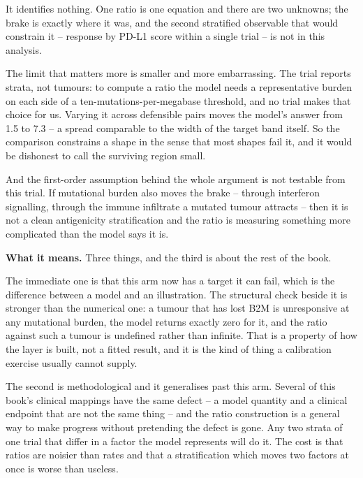 \documentclass[11pt,twoside,openright]{report}
\begin{document}
\begin{refusal}
It identifies nothing. One ratio is one equation and there are two unknowns; the brake is exactly where it was, and the second stratified observable that would constrain it -- response by PD-L1 score within a single trial -- is not in this analysis.

The limit that matters more is smaller and more embarrassing. The trial reports strata, not tumours: to compute a ratio the model needs a representative burden on each side of a ten-mutations-per-megabase threshold, and no trial makes that choice for us. Varying it across defensible pairs moves the model's answer from 1.5 to 7.3 -- a spread comparable to the width of the target band itself. So the comparison constrains a shape in the sense that most shapes fail it, and it would be dishonest to call the surviving region small.

And the first-order assumption behind the whole argument is not testable from this trial. If mutational burden also moves the brake -- through interferon signalling, through the immune infiltrate a mutated tumour attracts -- then it is not a clean antigenicity stratification and the ratio is measuring something more complicated than the model says it is.
\end{refusal}

\textbf{What it means.} Three things, and the third is about the rest of the book.

The immediate one is that this arm now has a target it can fail, which is the difference between a model and an illustration. The structural check beside it is stronger than the numerical one: a tumour that has lost B2M is unresponsive at any mutational burden, the model returns exactly zero for it, and the ratio against such a tumour is undefined rather than infinite. That is a property of how the layer is built, not a fitted result, and it is the kind of thing a calibration exercise usually cannot supply.

The second is methodological and it generalises past this arm. Several of this book's clinical mappings have the same defect -- a model quantity and a clinical endpoint that are not the same thing -- and the ratio construction is a general way to make progress without pretending the defect is gone. Any two strata of one trial that differ in a factor the model represents will do it. The cost is that ratios are noisier than rates and that a stratification which moves two factors at once is worse than useless.
\end{document}
